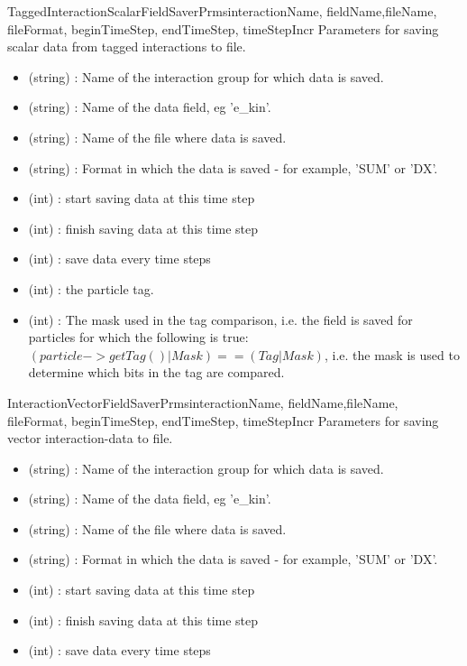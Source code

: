 \documentclass{manual}
\begin{document}
\begin{classdesc}{TaggedInteractionScalarFieldSaverPrms}{interactionName, fieldName,fileName, fileFormat, beginTimeStep, endTimeStep, timeStepIncr}
Parameters for saving scalar data from tagged interactions to file.
\begin{itemize}
\item {} (string) :  Name of the interaction group for which data is saved.
\item {} (string) : Name of the data field, eg 'e_kin'.
\item {} (string) : Name of the file where data is saved.
\item {} (string) : Format in which the data is saved - for example, 'SUM' or 'DX'.
\item {} (int) : start saving data at this time step
\item {} (int) : finish saving data at this time step
\item {} (int) : save data every  time steps
\item {} (int) :  the particle tag.
\item {} (int) : The mask used in the tag comparison, i.e. the field is saved for particles for which the following is true: $(particle->getTag() | Mask ) == (Tag | Mask)$, i.e. the mask is used to determine which bits in the tag are compared.
\end{itemize}
\end{classdesc}

\begin{classdesc}{InteractionVectorFieldSaverPrms}{interactionName, fieldName,fileName, fileFormat, beginTimeStep, endTimeStep, timeStepIncr}
Parameters for saving vector interaction-data to file.
\begin{itemize}
\item {} (string) :  Name of the interaction group for which data is saved.
\item {} (string) : Name of the data field, eg 'e_kin'.
\item {} (string) : Name of the file where data is saved.
\item {} (string) : Format in which the data is saved - for example, 'SUM' or 'DX'.
\item {} (int) : start saving data at this time step
\item {} (int) : finish saving data at this time step
\item {} (int) : save data every  time steps
\end{itemize}
\end{classdesc}
\end{document}
